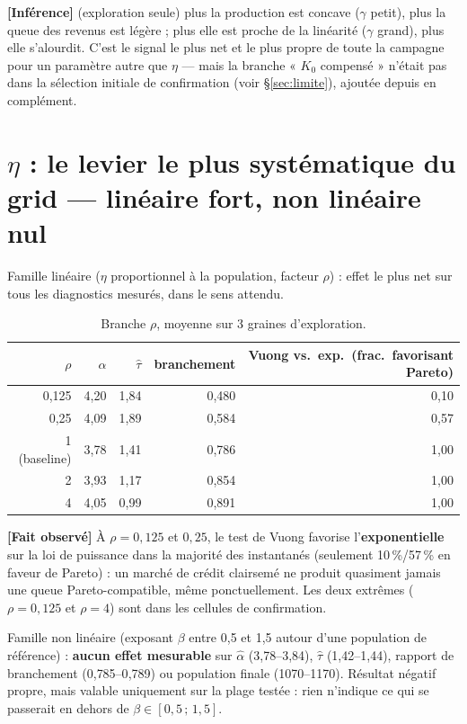\documentclass[11pt,a4paper]{article}
\newcommand{\fait}{\textbf{[Fait observé]}}
\newcommand{\inference}{\textbf{[Inférence]}}
\begin{document}
\inference{} (exploration seule) plus la production est concave
($\gamma$ petit), plus la queue des revenus est légère ; plus elle est
proche de la linéarité ($\gamma$ grand), plus elle s'alourdit. C'est le
signal le plus net et le plus propre de toute la campagne pour un
paramètre autre que $\eta$ --- mais la branche « $K_0$ compensé »
n'était pas dans la sélection initiale de confirmation (voir
\S\ref{sec:limite}), ajoutée depuis en complément.

\section{$\eta$ : le levier le plus systématique du grid --- linéaire
fort, non linéaire nul}

Famille linéaire ($\eta$ proportionnel à la population, facteur
$\rho$) : effet le plus net sur tous les diagnostics mesurés, dans le
sens attendu.

\begin{table}[h]
\centering
\begin{tabular}{@{}rrrrr@{}}
\toprule
$\rho$ & $\hat\alpha$ & $\hat\tau$ & branchement & Vuong vs.\ exp.\ (frac.\ favorisant Pareto) \\
\midrule
0{,}125 & 4{,}20 & 1{,}84 & 0{,}480 & 0{,}10 \\
0{,}25  & 4{,}09 & 1{,}89 & 0{,}584 & 0{,}57 \\
1 (baseline) & 3{,}78 & 1{,}41 & 0{,}786 & 1{,}00 \\
2      & 3{,}93 & 1{,}17 & 0{,}854 & 1{,}00 \\
4      & 4{,}05 & 0{,}99 & 0{,}891 & 1{,}00 \\
\bottomrule
\end{tabular}
\caption{Branche $\rho$, moyenne sur 3 graines d'exploration.}
\end{table}

\fait{} À $\rho=0{,}125$ et $0{,}25$, le test de Vuong favorise
l'\textbf{exponentielle} sur la loi de puissance dans la majorité des
instantanés (seulement 10\,\%/57\,\% en faveur de Pareto) : un marché
de crédit clairsemé ne produit quasiment jamais une queue
Pareto-compatible, même ponctuellement. Les deux extrêmes
($\rho=0{,}125$ et $\rho=4$) sont dans les cellules de confirmation.

Famille non linéaire (exposant $\beta$ entre 0{,}5 et 1{,}5 autour
d'une population de référence) : \textbf{aucun effet mesurable} sur
$\hat\alpha$ (3{,}78--3{,}84), $\hat\tau$ (1{,}42--1{,}44), rapport de
branchement (0{,}785--0{,}789) ou population finale (1070--1170).
Résultat négatif propre, mais valable uniquement sur la plage testée :
rien n'indique ce qui se passerait en dehors de $\beta \in
[0{,}5\,;\,1{,}5]$.
\end{document}
